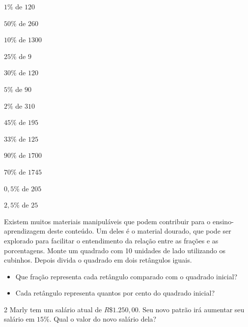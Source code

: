 {\begin{escolha}
\item $1\%$ de $120$ 
\item $50\%$ de $260$ 
\item $10\%$ de $1300$ 
\item $25\%$ de $9$ 
\item $30\%$ de $120$ 
\item $5\%$ de $90$ 
\item $2\%$ de $310$ 
\item $45\%$ de $195$ 
\item $33\%$ de $125$ 
\item $90\%$ de $1700$ 
\item $70\%$ de $1745$ 
\item $0,5\%$ de $205$ 
\item $2,5\%$ de $25$ 
\end{escolha}

\noindent Existem muitos materiais manipuláveis que podem contribuir para o
ensino-aprendizagem deste conteúdo. Um deles é o material dourado, que
pode ser explorado para facilitar o entendimento da relação entre as
frações e as porcentagens. Monte um quadrado com 10 unidades de lado utilizando os cubinhos. Depois divida o quadrado em dois retângulos iguais. 

\begin{itemize}
\item Que fração representa cada retângulo comparado com o quadrado inicial?
\item Cada retângulo representa quantos por cento do quadrado inicial?
\end{itemize}


\num{2}  Marly tem um salário atual de $R\$1.250,00$. Seu novo patrão irá
aumentar seu salário em $15\%$. Qual o valor do novo salário dela?

}
